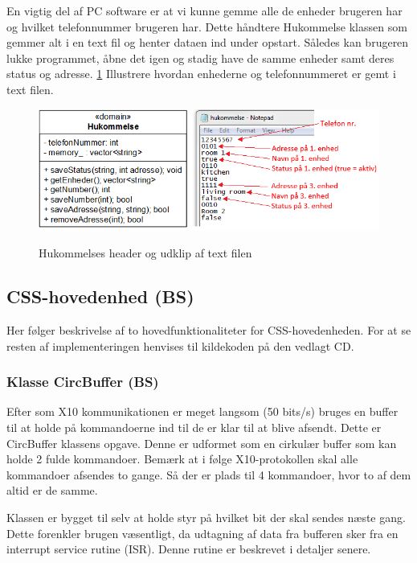\clearpage

En vigtig del af PC software er at vi kunne gemme alle de enheder brugeren har og hvilket telefonnummer brugeren har. Dette håndtere Hukommelse klassen som gemmer alt i en text fil og henter dataen ind under opstart. Således kan brugeren lukke programmet, åbne det igen og stadig have de samme enheder samt deres status og adresse. \ref{fig:Hukommelses header og udklip af text filen} Illustrere hvordan enhederne og telefonnummeret er gemt i text filen.

\begin{figure}[htbp] \centering
{\includegraphics[width=\textwidth]{billeder/uml/pc_dataview}}
\caption{Hukommelses header og udklip af text filen}
\label{fig:Hukommelses header og udklip af text filen}
\end{figure}

\subsection{CSS-hovedenhed (BS)}
Her følger beskrivelse af to hovedfunktionaliteter for CSS-hovedenheden. For at se resten af implementeringen henvises til kildekoden på den vedlagt CD.

\subsubsection{Klasse CircBuffer (BS)}
Efter som X10 kommunikationen er meget langsom (50 bits/s) bruges en buffer til at holde på kommandoerne ind til de er klar til at blive afsendt. Dette er CircBuffer klassens opgave.
Denne er udformet som en cirkulær buffer som kan holde 2 fulde kommandoer. Bemærk at i følge X10-protokollen skal alle kommandoer afsendes to gange. Så der er plads til 4 kommandoer, hvor to af dem altid er de samme.

Klassen er bygget til selv at holde styr på hvilket bit der skal sendes næste gang. Dette forenkler brugen væsentligt, da udtagning af data fra bufferen sker fra en interrupt service rutine (ISR). Denne rutine er beskrevet i detaljer senere.

